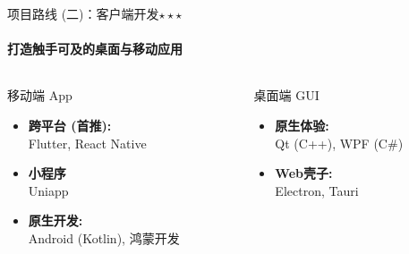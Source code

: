 \documentclass{beamer}
\begin{document}
\begin{frame}{项目路线 (二)：客户端开发$\star \star \star$}
    \framesubtitle{打造触手可及的桌面与移动应用}

    \begin{columns}[T]
        \begin{column}{0.5\textwidth}
            \begin{center}
                \huge 移动端 App
            \end{center}
            \begin{itemize}
                \item \textbf{跨平台 (首推):} \\ Flutter, React Native
                \item \textbf{小程序} \\ Uniapp
                \item \textbf{原生开发:} \\ Android (Kotlin), 鸿蒙开发
            \end{itemize}
        \end{column}
        \begin{column}{0.5\textwidth}
            \begin{center}
                \huge 桌面端 GUI
            \end{center}
            \begin{itemize}
                \item \textbf{原生体验:} \\ Qt (C++), WPF (C\#)
                \item \textbf{Web壳子:} \\ Electron, Tauri
            \end{itemize}
        \end{column}
    \end{columns}
    
\end{frame}
\end{document}
